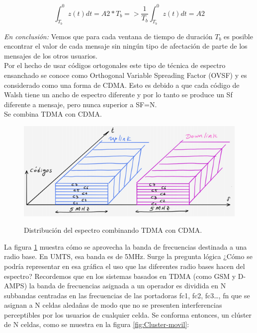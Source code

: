 \begin{equation} \label{capseis_once}
\int_{T_{b}}^0 z(t)dt = A2* T_{b} => \dfrac{1}{T_{b}} \int_{T_{b}}^0 z(t)dt = A2
\end{equation}

\textit{En conclusión:} Vemos que para cada ventana de tiempo de duración $T_{b}$ es posible encontrar el valor de cada mensaje sin ningún tipo de afectación de parte de los mensajes de los otros usuarios. \\

Por el hecho de usar códigos ortogonales este tipo de técnica de espectro ensanchado se conoce como Orthogonal Variable Spreading Factor (OVSF) y es considerado como una forma de CDMA. Esto es debido a que cada código de Walsh tiene un ancho de espectro diferente y por lo tanto se produce un Sf diferente a mensaje, pero nunca superior a SF=N. \\

Se combina TDMA con CDMA. 

\begin{figure}[h!]
	\captionsetup{justification = raggedright, singlelinecheck = false}
	\caption{Distribución del espectro combinando TDMA con CDMA.} 
	\centering
	\includegraphics[scale=1]{Imagenes/TDMA.png}
	\label{fig:TDMA}
\end{figure}

La figura \ref{fig:TDMA} muestra cómo se aprovecha la banda de frecuencias destinada a una radio base. En UMTS, esa banda es de 5MHz. Surge la pregunta lógica ¿Cómo se podría representar en esa gráfica el uso que las diferentes radio bases hacen del espectro? Recordemos que en los sistemas basados en TDMA (como GSM y D-AMPS) la banda de frecuencias asignada a un operador es dividida en N subbandas centradas en las frecuencias de las portadoras fc1, fc2, fc3…, fn que se asignan a N celdas aledañas de modo que no se presenten interferencias perceptibles por los usuarios de cualquier celda. Se conforma entonces, un clúster de N celdas, como se muestra en la figura \ref{fig:Cluster-movil}: 

